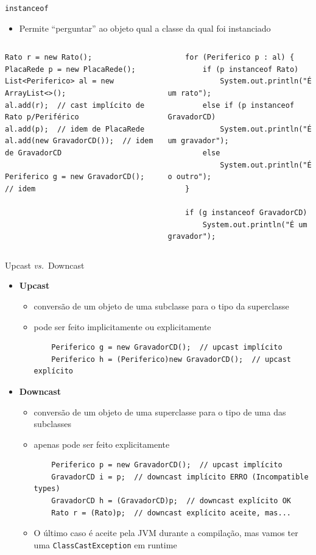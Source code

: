 \documentclass[portuguese, aspectratio=169, xcolor=table]{beamer}
\begin{document}
\begin{frame}[fragile]{\texttt{instanceof}}
\begin{itemize}
    \item Permite ``perguntar'' ao objeto qual a classe da qual foi instanciado
\end{itemize}
\begin{columns}
\scriptsize
\begin{verbatim}
Rato r = new Rato();
PlacaRede p = new PlacaRede();
List<Periferico> al = new ArrayList<>();
al.add(r);  // cast implícito de Rato p/Periférico
al.add(p);  // idem de PlacaRede
al.add(new GravadorCD());  // idem de GravadorCD

Periferico g = new GravadorCD();  // idem
\end{verbatim}
\scriptsize
\begin{verbatim}
    for (Periferico p : al) {
        if (p instanceof Rato)
            System.out.println("É um rato");
        else if (p instanceof GravadorCD)
            System.out.println("É um gravador");
        else
            System.out.println("É o outro");
    }

    if (g instanceof GravadorCD)
        System.out.println("É um gravador");
\end{verbatim}
\end{columns}
\end{frame}

\begin{frame}[fragile]{Upcast \textit{vs.}\ Downcast}
\begin{itemize}
    \item \textbf{Upcast}
    \begin{itemize}
        \item conversão de um objeto de uma subclasse para o tipo da superclasse
        \item pode ser feito implicitamente ou explicitamente
\begin{verbatim}
    Periferico g = new GravadorCD();  // upcast implícito
    Periferico h = (Periferico)new GravadorCD();  // upcast explícito
\end{verbatim}
    \end{itemize}
    \item \textbf{Downcast}
    \begin{itemize}
        \item conversão de um objeto de uma superclasse para o tipo de uma das subclasses 
        \item apenas pode ser feito explicitamente
\begin{verbatim}
    Periferico p = new GravadorCD();  // upcast implícito
    GravadorCD i = p;  // downcast implícito ERRO (Incompatible types)
    GravadorCD h = (GravadorCD)p;  // downcast explícito OK
    Rato r = (Rato)p;  // downcast explícito aceite, mas...
\end{verbatim}
\item O último caso é aceite pela JVM durante a compilação, mas vamos ter uma \texttt{ClassCastException} em runtime
    \end{itemize}
\end{itemize}
\end{frame}
\end{document}
